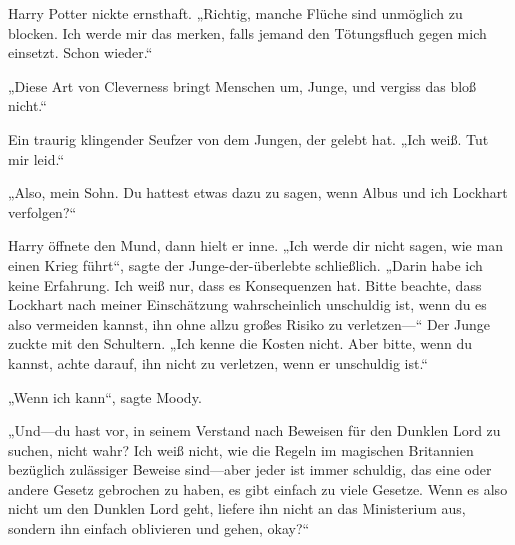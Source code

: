 Harry Potter nickte ernsthaft. „Richtig, manche Flüche sind unmöglich zu blocken. Ich werde mir das merken, falls jemand den Tötungsfluch gegen mich einsetzt. Schon wieder.“

„Diese Art von Cleverness bringt Menschen um, Junge, und vergiss das bloß nicht.“

Ein traurig klingender Seufzer von dem Jungen, der gelebt hat. „Ich weiß. Tut mir leid.“

„Also, mein Sohn. Du hattest etwas dazu zu sagen, wenn Albus und ich Lockhart verfolgen?“

Harry öffnete den Mund, dann hielt er inne. „Ich werde dir nicht sagen, wie man einen Krieg führt“, sagte der Junge-der-überlebte schließlich. „Darin habe ich keine Erfahrung. Ich weiß nur, dass es Konsequenzen hat. Bitte beachte, dass Lockhart nach meiner Einschätzung wahrscheinlich unschuldig ist, wenn du es also vermeiden kannst, ihn ohne allzu großes Risiko zu verletzen—“ Der Junge zuckte mit den Schultern. „Ich kenne die Kosten nicht. Aber bitte, wenn du kannst, achte darauf, ihn nicht zu verletzen, wenn er unschuldig ist.“

„Wenn ich kann“, sagte Moody.

„Und—du hast vor, in seinem Verstand nach Beweisen für den Dunklen Lord zu suchen, nicht wahr? Ich weiß nicht, wie die Regeln im magischen Britannien bezüglich zulässiger Beweise sind—aber jeder ist immer schuldig, das eine oder andere Gesetz gebrochen zu haben, es gibt einfach zu viele Gesetze. Wenn es also nicht um den Dunklen Lord geht, liefere ihn nicht an das Ministerium aus, sondern ihn einfach oblivieren und gehen, okay?“

